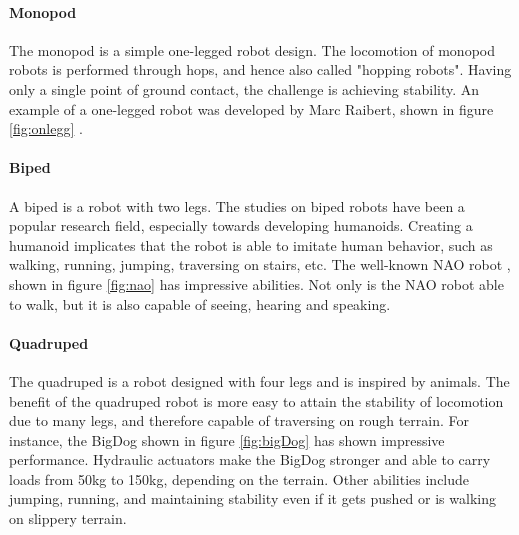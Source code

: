 \documentclass[USenglish]{ifimaster}  %
\begin{document}



\paragraph{Monopod}
The monopod is a simple one-legged robot design. The locomotion of monopod robots is performed through hops, and hence also called "hopping robots". Having only a single point of ground contact, the challenge is achieving stability. An example of a one-legged robot was developed by Marc Raibert, shown in figure \ref{fig:onlegg} \cite{Raibert:1986:LR:5948.5950}.

\paragraph{Biped}
A biped is a robot with two legs. The studies on biped robots have been a popular research field, especially towards developing humanoids. Creating a humanoid implicates that the robot is able to imitate human behavior, such as walking, running, jumping, traversing on stairs, etc. The well-known NAO robot \cite{NAO}, shown in figure \ref{fig:nao} has impressive abilities. Not only is the NAO robot able to walk, but it is also capable of seeing, hearing and speaking. 

\paragraph{Quadruped}
The quadruped is a robot designed with four legs and is inspired by animals. The benefit of the quadruped robot is more easy to attain the stability of locomotion due to many legs, and therefore capable of traversing on rough terrain. For instance, the BigDog \cite{Raibert200810822} shown in figure \ref{fig:bigDog} has shown impressive performance. Hydraulic actuators make the BigDog stronger and able to carry loads from 50kg to 150kg, depending on the terrain. Other abilities include jumping, running, and maintaining stability even if it gets pushed or is walking on slippery terrain.
\end{document}
